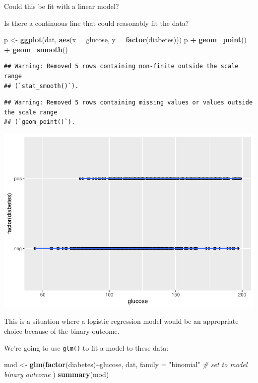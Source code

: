 \documentclass[
]{book}
\newenvironment{Shaded}{\begin{snugshade}}{\end{snugshade}}
\newcommand{\AttributeTok}[1]{\textcolor[rgb]{0.13,0.29,0.53}{#1}}
\newcommand{\CommentTok}[1]{\textcolor[rgb]{0.56,0.35,0.01}{\textit{#1}}}
\newcommand{\FunctionTok}[1]{\textcolor[rgb]{0.13,0.29,0.53}{\textbf{#1}}}
\newcommand{\NormalTok}[1]{#1}
\newcommand{\OtherTok}[1]{\textcolor[rgb]{0.56,0.35,0.01}{#1}}
\newcommand{\SpecialCharTok}[1]{\textcolor[rgb]{0.81,0.36,0.00}{\textbf{#1}}}
\newcommand{\StringTok}[1]{\textcolor[rgb]{0.31,0.60,0.02}{#1}}
\begin{document}
Could this be fit with a linear model?

Is there a continuous line that could reasonably fit the data?

\begin{Shaded}
\begin{Highlighting}[]
\NormalTok{p }\OtherTok{\textless{}{-}} \FunctionTok{ggplot}\NormalTok{(dat, }\FunctionTok{aes}\NormalTok{(}\AttributeTok{x =}\NormalTok{ glucose, }\AttributeTok{y =} \FunctionTok{factor}\NormalTok{(diabetes)))}
\NormalTok{p }\SpecialCharTok{+} \FunctionTok{geom\_point}\NormalTok{() }\SpecialCharTok{+} \FunctionTok{geom\_smooth}\NormalTok{()}
\end{Highlighting}
\end{Shaded}

\begin{verbatim}
## Warning: Removed 5 rows containing non-finite outside the scale range
## (`stat_smooth()`).
\end{verbatim}

\begin{verbatim}
## Warning: Removed 5 rows containing missing values or values outside the scale range
## (`geom_point()`).
\end{verbatim}

\includegraphics{_main_files/figure-latex/unnamed-chunk-73-1.pdf}

This is a situation where a logistic regression model would be an appropriate choice because of the binary outcome.

We're going to use \texttt{glm()} to fit a model to these data:

\begin{Shaded}
\begin{Highlighting}[]
\NormalTok{mod }\OtherTok{\textless{}{-}} \FunctionTok{glm}\NormalTok{(}\FunctionTok{factor}\NormalTok{(diabetes)}\SpecialCharTok{\textasciitilde{}}\NormalTok{glucose, }
\NormalTok{    dat,}
    \AttributeTok{family =} \StringTok{"binomial"} \CommentTok{\# set to model binary outcome}
\NormalTok{)}
\FunctionTok{summary}\NormalTok{(mod)}
\end{Highlighting}
\end{Shaded}
\end{document}
